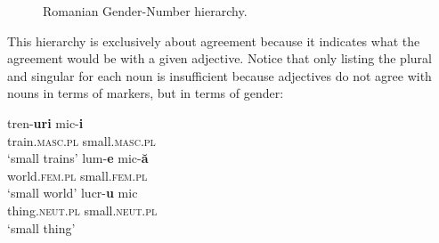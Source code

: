 \begin{figure}
    \caption{Romanian Gender-Number hierarchy.} \label{fig:romanian-hierar}
\end{figure}

This hierarchy is exclusively about agreement because it indicates what the agreement would be with a given adjective. Notice that only listing the plural and singular for each noun is insufficient because adjectives do not agree with nouns in terms of markers, but in terms of gender:

\begin{exe}
    \ex
    \begin{xlist}
        \ex 
        \gll tren-\textbf{uri} mic-\textbf{i}\\
        train.\textsc{masc.pl} small.\textsc{masc.pl}\\
        \glt `small trains'
        \ex 
        \gll lum-\textbf{e} mic-\textbf{ă}\\
        world.\textsc{fem.pl} small.\textsc{fem.pl}\\
        \glt `small world'
        \ex 
        \gll lucr-\textbf{u} mic\\
        thing.\textsc{neut.pl} small.\textsc{neut.pl}\\
        \glt `small thing'
    \end{xlist}
\end{exe}

